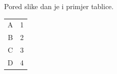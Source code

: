 Pored slike dan je i primjer tablice.

\begin{table}[!h]
\label{tablica}
  \centering
\begin{tabular}{|c c|} \hline
    A & 1 \\
    B & 2 \\
    C & 3 \\
    D & 4 \\ \hline
\end{tabular}
\end{table}

